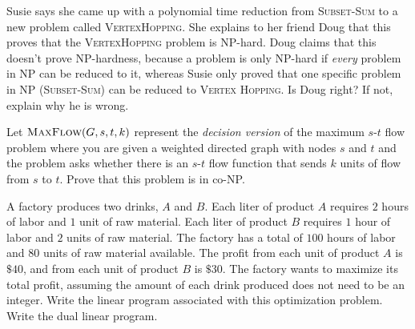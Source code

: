 \documentclass[11  pt]{exam}
\begin{document}
\begin{questions}
	\question Susie says she came up with a polynomial time reduction from \textsc{Subset-Sum} to a new problem called \textsc{VertexHopping}. She explains to her friend Doug that this proves that the \textsc{VertexHopping} problem is NP-hard. Doug claims that this doesn't prove NP-hardness, because a problem is only NP-hard if \emph{every} problem in NP can be reduced to it, whereas Susie only proved that one specific problem in NP (\textsc{Subset-Sum}) can be reduced to \textsc{Vertex Hopping}. Is Doug right? If not, explain why he is wrong.

	
	\question Let $\textsc{MaxFlow}(G,s,t,k)$ represent the \emph{decision version} of the maximum $s$-$t$ flow problem where you are given a weighted directed graph with nodes $s$ and $t$ and the problem asks whether there is an $s$-$t$ flow function that sends $k$ units of flow from $s$ to $t$. Prove that this problem is in co-NP.
	
	
	\question A factory produces two drinks, $A$ and $B$. Each liter of product $A$ requires $2$ hours of labor and $1$ unit of raw material. Each liter of product $B$ requires $1$ hour of labor and $2$ units of raw material. The factory has a total of $100$ hours of labor and $80$ units of raw material available. The profit from each unit of product $A$ is $\$40$, and from each unit of product $B$ is $\$30$. The factory wants to maximize its total profit, assuming the amount of each drink produced does not need to be an integer. Write the linear program associated with this optimization problem. Write the dual linear program. 
	
\end{questions}
\end{document}
